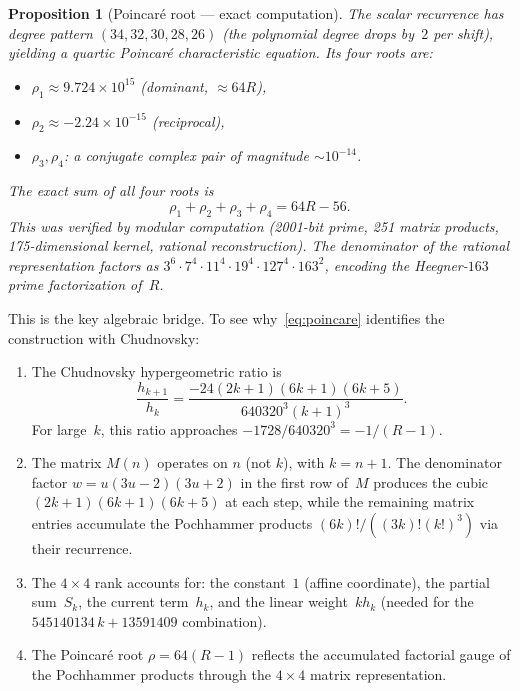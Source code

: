 \documentclass[11pt]{article}
\newtheorem{proposition}[theorem]{Proposition}
\theoremstyle{remark}
\begin{document}
\begin{proposition}[Poincar\'e root --- exact computation]
The scalar recurrence has degree pattern $(34, 32, 30, 28, 26)$
(the polynomial degree drops by~$2$ per shift), yielding a
quartic Poincar\'e characteristic equation.  Its four roots are:
\begin{itemize}
\item $\rho_1 \approx 9.724 \times 10^{15}$ (dominant, $\approx 64R$),
\item $\rho_2 \approx -2.24 \times 10^{-15}$ (reciprocal),
\item $\rho_3, \rho_4$: a conjugate complex pair of magnitude
  $\sim 10^{-14}$.
\end{itemize}

The \emph{exact} sum of all four roots is
\begin{equation}\label{eq:poincare}
\boxed{\rho_1 + \rho_2 + \rho_3 + \rho_4 = 64R - 56.}
\end{equation}
This was verified by modular computation (2001-bit prime,
251 matrix products, 175-dimensional kernel, rational
reconstruction).  The denominator of the rational representation
factors as $3^6 \cdot 7^4 \cdot 11^4 \cdot 19^4 \cdot 127^4
\cdot 163^2$, encoding the Heegner-$163$ prime factorization
of~$R$.
\end{proposition}

This is the key algebraic bridge.  To see why~\eqref{eq:poincare}
identifies the construction with Chudnovsky:

\begin{enumerate}
\item The Chudnovsky hypergeometric ratio is
\[
\frac{h_{k+1}}{h_k} = \frac{-24(2k+1)(6k+1)(6k+5)}{640320^3(k+1)^3}.
\]
For large~$k$, this ratio approaches $-1728/640320^3 = -1/(R-1)$.

\item The matrix $M(n)$ operates on $n$ (not $k$), with $k = n+1$.
The denominator factor $w = u(3u-2)(3u+2)$ in the first row of~$M$
produces the cubic $(2k+1)(6k+1)(6k+5)$ at each step, while the
remaining matrix entries accumulate the Pochhammer products
$(6k)!/((3k)!(k!)^3)$ via their recurrence.

\item The $4\times 4$ rank accounts for: the constant~$1$
(affine coordinate), the partial sum~$S_k$, the current
term~$h_k$, and the linear weight~$k h_k$ (needed for
the $545140134\,k + 13591409$ combination).

\item The Poincar\'e root $\rho = 64(R-1)$ reflects the
accumulated factorial gauge of the Pochhammer products
through the $4\times 4$ matrix representation.
\end{enumerate}
\end{document}
